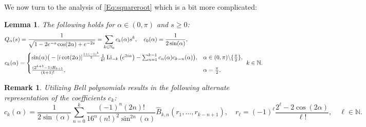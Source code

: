 \documentclass[letterpaper,10pt]{amsart}
\newtheorem{lem}[thm]{Lemma}
\newtheorem{remark}[thm]{Remark}
\DeclareMathOperator{\Li}{Li}
\numberwithin{equation}{section}
\begin{document}
We now turn to the analysis of \eqref{Eq:squareroot} which is a bit more complicated:
\begin{lem}\label{Lem:Sqrt}
The following holds for $\alpha\in(0,\pi)$ and $s\geq0$: 
\begin{align}\label{Eq:Sqrtseries}
&Q_\alpha(s)=\frac{1}{\sqrt{1-2e^{-s}\cos(2\alpha)+e^{-2s}}}=\sum_{k\in\mathbb{N}_0}c_k(\alpha)s^k,\quad c_0(\alpha)=\frac{1}{2\sin(\alpha)},\\
&c_k(\alpha)=\begin{cases}
\sin(\alpha)\big(-[i\cot(2\alpha)]^{\frac{1+(-1)^k}{2}}\frac{1}{k!}\Li_{-k}\big(e^{2i\alpha}\big)-\sum_{n=1}^{k-1}c_n(\alpha) c_{k-n}(\alpha)\big),& \alpha\in(0,\pi)\backslash\{\tfrac{\pi}{2}\},\\[2mm]
\frac{(2^{k+1}-1)B_{k+1}}{(k+1)!},& \alpha=\tfrac{\pi}{2},
\end{cases}\ k\in\mathbb{N}.\notag
\end{align}
\end{lem}

\begin{remark}\label{Rem:sqrt}
Utilizing Bell polynomials results in the following alternate representation of the coefficients $c_k$:
\begin{equation}
c_k(\alpha)=\frac{1}{2\sin(\alpha)}\sum_{n=0}^k\frac{(-1)^n(2n)!}{16^{n}(n!)^2 \sin^{2n}(\alpha)} \widehat{B}_{k,n}(r_1,\dots,r_{k-n+1}),\quad r_\ell=(-1)^\ell\frac{2^\ell-2\cos(2\alpha)}{\ell!},\quad \ell\in\mathbb{N}.
\end{equation}
\end{remark}
\end{document}
